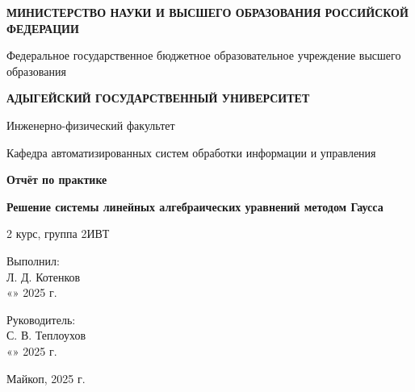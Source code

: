 \documentclass[a4paper,12pt]{article}
\newcommand{\ministry}{МИНИСТЕРСТВО НАУКИ И ВЫСШЕГО ОБРАЗОВАНИЯ РОССИЙСКОЙ ФЕДЕРАЦИИ}
\newcommand{\university}{Федеральное государственное бюджетное образовательное учреждение высшего образования}
\newcommand{\universityname}{АДЫГЕЙСКИЙ ГОСУДАРСТВЕННЫЙ УНИВЕРСИТЕТ}
\newcommand{\faculty}{Инженерно-физический факультет}
\newcommand{\department}{Кафедра автоматизированных систем обработки информации и управления}
\newcommand{\reporttitle}{Отчёт по практике}
\newcommand{\reporttheme}{Решение системы линейных алгебраических уравнений методом Гаусса}
\newcommand{\studentinfo}{2 курс, группа 2ИВТ}
\newcommand{\studentname}{Л. Д. Котенков}
\newcommand{\supervisor}{С. В. Теплоухов}
\newcommand{\cityyear}{Майкоп, 2025 г.}
\begin{document}
\begin{titlepage}
    \vspace*{0.5cm}
    \centering
    
    \textbf{\ministry}
    
    \vspace{0.3cm}
    \university
    
    \vspace{0.3cm}
    \textbf{\universityname}
    
    \vspace{0.5cm}
    \faculty
    
    \department
    
    \vspace{2cm}
    \textbf{\reporttitle}
    
    \vspace{0.5cm}
    \textbf{\reporttheme}
    
    \vspace{2cm}
    \studentinfo
    
    \vfill
    
    \begin{flushright}
        \begin{minipage}{7cm}
            \noindent
            Выполнил: \\
            \underline{\hspace{3.8cm}} \studentname \\
            «\underline{\hspace{0.7cm}}» \underline{\hspace{2.5cm}} 2025 г. \\
            
            \vspace{0.5cm}
            
            Руководитель: \\
            \underline{\hspace{3.8cm}} \supervisor \\
            «\underline{\hspace{0.7cm}}» \underline{\hspace{2.5cm}} 2025 г. \\
        \end{minipage}
    \end{flushright}
    
    \vspace{1cm}
    \cityyear
\end{titlepage}

\newpage
\renewcommand{\contentsname}{Оглавление}
\tableofcontents
\end{document}
